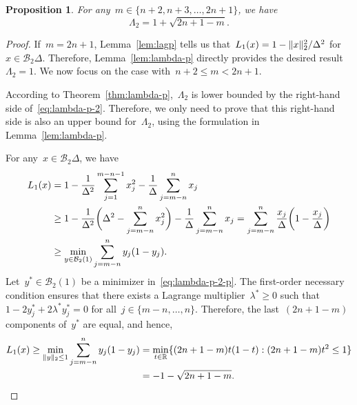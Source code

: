 \documentclass[draft]{article}
\numberwithin{equation}{section}
\theoremstyle{definition}
\theoremstyle{plain}
\newtheorem{proposition}{Proposition}[section]
\newcommand{\lagp}[1][]{L\ifblank{#1}{}{_{#1}}}
\newcommand{\norm}[2][]{#1\lVert#2#1\rVert}
\newcommand{\R}{\mathbb{R}}
\newcommand{\set}[2][]{#1\{#2#1\}}
\begin{document}
\begin{proposition}
    \label{prop:lambda-p-2}
    For any~$m \in \set{n + 2, n + 3, \dots, 2n + 1}$, we have
    \begin{equation}
        \label{eq:lambda-p-2}
        \Lambda_2 = 1 + \sqrt{2n + 1 - m}.
    \end{equation}
\end{proposition}

\begin{proof}
    If~$m = 2n + 1$, Lemma~\ref{lem:lagp} tells us that~$\lagp[1](x) = 1 - \norm{x}_2^2 / \Delta^2$ for~$x \in \mathcal{B}_2{\Delta}$.
    Therefore, Lemma~\ref{lem:lambda-p} directly provides the desired result~$\Lambda_2 = 1$.
    We now focus on the case with~$n + 2 \le m < 2n + 1$.

    According to Theorem~\ref{thm:lambda-p},~$\Lambda_2$ is lower bounded by the right-hand side of~\ref{eq:lambda-p-2}.
    Therefore, we only need to prove that this right-hand side is also an upper bound for~$\Lambda_2$, using the formulation in Lemma~\ref{lem:lambda-p}.

    For any~$x \in \mathcal{B}_2{\Delta}$, we have
    \begin{align}
        \lagp[1](x) &= 1 - \frac{1}{\Delta^2} \sum_{j = 1}^{m - n - 1} x_j^2 - \frac{1}{\Delta} \sum_{j = m - n}^n x_j \nonumber\\
                    &\ge 1 - \frac{1}{\Delta^2} \bigg( \Delta^2 - \sum_{j = m - n}^n x_j^2 \bigg) - \frac{1}{\Delta} \sum_{j = m - n}^n x_j = \sum_{j = m - n}^n \frac{x_j}{\Delta} \bigg( 1 - \frac{x_j}{\Delta} \bigg) \nonumber\\
                    &\ge \min_{y \in \mathcal{B}_2(1)} \sum_{j = m - n}^n y_j (1 - y_j). \label{eq:lambda-p-2-p}
    \end{align}
    Let~$y^{\ast} \in \mathcal{B}_2(1)$ be a minimizer in~\eqref{eq:lambda-p-2-p}.
    The first-order necessary condition ensures that there exists a Lagrange multiplier~$\lambda^{\ast} \ge 0$ such that~$1 - 2 y_j^{\ast} + 2 \lambda^{\ast} y_j^{\ast} = 0$ for all~$j \in \set{m - n, \dots, n}$.
    Therefore, the last~$(2n + 1 - m)$ components of~$y^{\ast}$ are equal, and hence,
    \begin{align*}
        \lagp[1](x) \ge \min_{\norm{y}_2 \le 1} \sum_{j = m - n}^n y_j (1 - y_j)    & = \min_{t \in \R} \set{(2n + 1 - m) t (1 - t) : (2n + 1 - m) t^2 \le 1}\\
                                                                                    & = -1 - \sqrt{2n + 1 - m}.
    \end{align*}


\end{proof}
\end{document}
